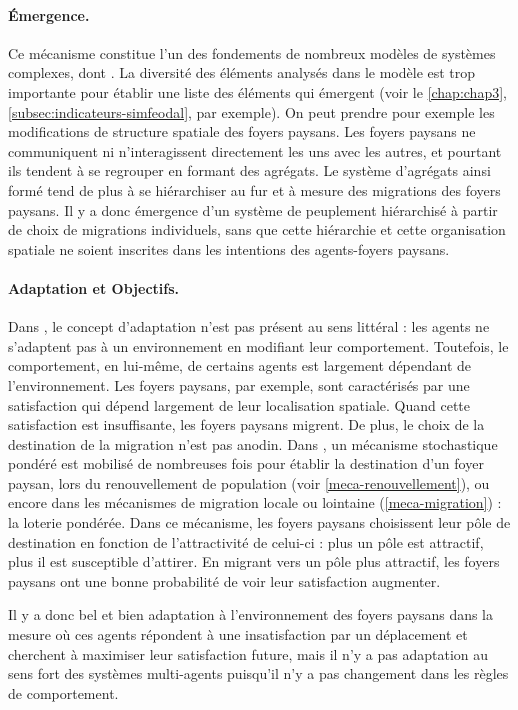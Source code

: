 \paragraph{Émergence.} Ce mécanisme constitue l'un des fondements de nombreux modèles de systèmes complexes, dont \simfeodal{}.
La diversité des éléments analysés dans le modèle est trop importante pour établir une liste des éléments qui émergent (voir le \cref{chap:chap3}, \cref{subsec:indicateurs-simfeodal}, par exemple).
On peut prendre pour exemple les modifications de structure spatiale des foyers paysans.
Les foyers paysans ne communiquent ni n'interagissent directement les uns avec les autres, et pourtant ils tendent à se regrouper en formant des agrégats.
Le système d'agrégats ainsi formé tend de plus à se hiérarchiser au fur et à mesure des migrations des foyers paysans.
Il y a donc émergence d'un système de peuplement hiérarchisé à partir de choix de migrations individuels, sans que cette hiérarchie et cette organisation spatiale ne soient inscrites dans les intentions des agents-foyers paysans.

\paragraph{Adaptation et Objectifs.} Dans \simfeodal{}, le concept d'adaptation n'est pas présent au sens littéral : les agents ne s'adaptent pas à un environnement en modifiant leur comportement.
Toutefois, le comportement, en lui-même, de certains agents est largement dépendant de l'environnement.
Les foyers paysans, par exemple, sont caractérisés par une satisfaction qui dépend largement de leur localisation spatiale.
Quand cette satisfaction est insuffisante, les foyers paysans migrent.
De plus, le choix de la destination de la migration n'est pas anodin.
Dans \simfeodal{}, un mécanisme stochastique pondéré est mobilisé de nombreuses fois pour établir la destination d'un foyer paysan, lors du renouvellement de population (voir \cref{meca-renouvellement}), ou encore dans les mécanismes de migration locale ou lointaine (\cref{meca-migration}) : 
la \og loterie pondérée\fg{}.
Dans ce mécanisme, les foyers paysans \og choisissent\fg{} leur pôle de destination en fonction de l'attractivité de celui-ci :
plus un pôle est attractif, plus il est susceptible d'attirer.
En migrant vers un pôle plus attractif, les foyers paysans ont une bonne probabilité de voir leur satisfaction augmenter.

Il y a donc bel et bien adaptation à l'environnement des foyers paysans dans la mesure où ces agents répondent à une insatisfaction par un déplacement et cherchent à maximiser leur satisfaction future, mais il n'y a pas adaptation au sens fort des systèmes multi-agents puisqu'il n'y a pas changement dans les règles de comportement.


